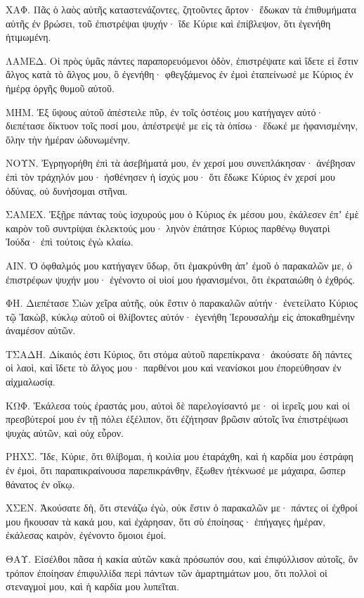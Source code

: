 {\par }{\PP {}ΧΑΦ. Πᾶς ὁ λαὸς αὐτῆς καταστενάζοντες, ζητοῦντες ἄρτον· ἔδωκαν τὰ ἐπιθυμήματα αὐτῆς ἐν βρώσει, τοῦ ἐπιστρέψαι ψυχήν· ἴδε Κύριε καὶ ἐπίβλεψον, ὅτι ἐγενήθη ἠτιμωμένη.
\par }{\PP {}ΛΑΜΕΔ. Οἱ πρὸς ὑμᾶς πάντες παραπορευόμενοι ὁδὸν, ἐπιστρέψατε καὶ ἴδετε εἰ ἔστιν ἄλγος κατὰ τὸ ἄλγος μου, ὃ ἐγενήθη· φθεγξάμενος ἐν ἐμοὶ ἐταπείνωσέ με Κύριος ἐν ἡμέρᾳ ὀργῆς θυμοῦ αὐτοῦ.
\par }{\PP {}ΜΗΜ. Ἐξ ὕψους αὐτοῦ ἀπέστειλε πῦρ, ἐν τοῖς ὀστέοις μου κατήγαγεν αὐτό· διεπέτασε δίκτυον τοῖς ποσί μου, ἀπέστρεψέ με εἰς τὰ ὀπίσω· ἔδωκέ με ἠφανισμένην, ὅλην τὴν ἡμέραν ὠδυνωμένην.
\par }{\PP {}ΝΟΥΝ. Ἐγρηγορήθη ἐπὶ τὰ ἀσεβήματά μου, ἐν χερσί μου συνεπλάκησαν· ἀνέβησαν ἐπὶ τὸν τράχηλόν μου· ἠσθένησεν ἡ ἰσχύς μου· ὅτι ἔδωκε Κύριος ἐν χερσί μου ὀδύνας, οὐ δυνήσομαι στῆναι.
\par }{\PP {}ΣΑΜΕΧ. Ἐξῇρε πάντας τοὺς ἰσχυρούς μου ὁ Κύριος ἐκ μέσου μου, ἐκάλεσεν ἐπʼ ἐμὲ καιρὸν τοῦ συντρίψαι ἐκλεκτούς μου· ληνὸν ἐπάτησε Κύριος παρθένῳ θυγατρὶ Ἰούδα· ἐπὶ τούτοις ἐγὼ κλαίω.
\par }{\PP {}ΑΙΝ. Ὁ ὀφθαλμός μου κατήγαγεν ὕδωρ, ὅτι ἐμακρύνθη ἀπʼ ἐμοῦ ὁ παρακαλῶν με, ὁ ἐπιστρέφων ψυχήν μου· ἐγένοντο οἱ υἱοί μου ἠφανισμένοι, ὅτι ἐκραταιώθη ὁ ἐχθρός.
\par }{\PP {}ΦΗ. Διεπέτασε Σιὼν χεῖρα αὐτῆς, οὐκ ἔστιν ὁ παρακαλῶν αὐτήν· ἐνετείλατο Κύριος τῷ Ἰακὼβ, κύκλῳ αὐτοῦ οἱ θλίβοντες αὐτόν· ἐγενήθη Ἱερουσαλὴμ εἰς ἀποκαθημένην ἀναμέσον αὐτῶν.
\par }{\PP {}ΤΣΑΔΗ. Δίκαιός ἐστι Κύριος, ὅτι στόμα αὐτοῦ παρεπίκρανα· ἀκούσατε δὴ πάντες οἱ λαοὶ, καὶ ἴδετε τὸ ἄλγος μου· παρθένοι μου καὶ νεανίσκοι μου ἐπορεύθησαν ἐν αἰχμαλωσίᾳ.
\par }{\PP {}ΚΩΦ. Ἐκάλεσα τοὺς ἐραστάς μου, αὐτοὶ δὲ παρελογίσαντό με· οἱ ἱερεῖς μου καὶ οἱ πρεσβύτεροί μου ἐν τῇ πόλει ἐξέλιπον, ὅτι ἐζήτησαν βρῶσιν αὐτοῖς ἵνα ἐπιστρέψωσι ψυχὰς αὐτῶν, καὶ οὐχ εὗρον.
\par }{\PP {}ΡΗΧΣ. Ἴδε, Κύριε, ὅτι θλίβομαι, ἡ κοιλία μου ἐταράχθη, καὶ ἡ καρδία μου ἐστράφη ἐν ἐμοὶ, ὅτι παραπικραίνουσα παρεπικράνθην, ἔξωθεν ἠτέκνωσέ με μάχαιρα, ὥσπερ θάνατος ἐν οἴκῳ.
\par }{\PP {}ΧΣΕΝ. Ἀκούσατε δὴ, ὅτι στενάζω ἐγὼ, οὐκ ἔστιν ὁ παρακαλῶν με· πάντες οἱ ἐχθροί μου ἤκουσαν τὰ κακά μου, καὶ ἐχάρησαν, ὅτι σὺ ἐποίησας· ἐπήγαγες ἡμέραν, ἐκάλεσας καιρὸν, ἐγένοντο ὅμοιοι ἐμοί.
\par }{\PP {}ΘΑΥ. Εἰσέλθοι πᾶσα ἡ κακία αὐτῶν κακὰ πρόσωπόν σου, καὶ ἐπιφύλλισον αὐτοῖς, ὃν τρόπον ἐποίησαν ἐπιφυλλίδα περὶ πάντων τῶν ἁμαρτημάτων μου, ὅτι πολλοὶ οἱ στεναγμοί μου, καὶ ἡ καρδία μου λυπεῖται.

}
